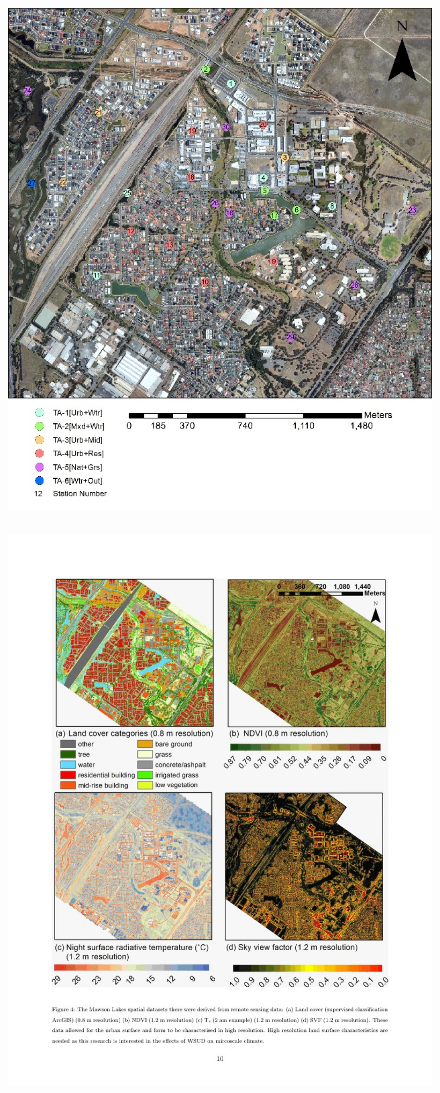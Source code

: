 \documentclass[final,3p,times,authoryear]{elsarticle}
\begin{document}
\begin{figure}[!htbp]
\includegraphics[trim=0mm 0mm 0mm 0mm, clip,scale=1.25]{images/Mawson1.jpg}
~
\includegraphics[trim=30mm 194mm 142mm 28mm, clip,scale=0.78]{images/Mawson2.png}

\end{figure}
\end{document}
